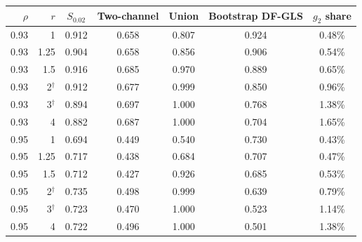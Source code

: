 \begin{tabular}{rrccccc}
\toprule
$\rho$ & $r$ & $S_{0.02}$ & Two-channel & Union & Bootstrap DF-GLS & $g_2$ share \\
\midrule
0.93 & 1 & 0.912 & 0.658 & 0.807 & 0.924 & 0.48\% \\
0.93 & 1.25 & 0.904 & 0.658 & 0.856 & 0.906 & 0.54\% \\
0.93 & 1.5 & 0.916 & 0.685 & 0.970 & 0.889 & 0.65\% \\
0.93 & 2$^\dagger$ & 0.912 & 0.677 & 0.999 & 0.850 & 0.96\% \\
0.93 & 3$^\dagger$ & 0.894 & 0.697 & 1.000 & 0.768 & 1.38\% \\
0.93 & 4 & 0.882 & 0.687 & 1.000 & 0.704 & 1.65\% \\
0.95 & 1 & 0.694 & 0.449 & 0.540 & 0.730 & 0.43\% \\
0.95 & 1.25 & 0.717 & 0.438 & 0.684 & 0.707 & 0.47\% \\
0.95 & 1.5 & 0.712 & 0.427 & 0.926 & 0.685 & 0.53\% \\
0.95 & 2$^\dagger$ & 0.735 & 0.498 & 0.999 & 0.639 & 0.79\% \\
0.95 & 3$^\dagger$ & 0.723 & 0.470 & 1.000 & 0.523 & 1.14\% \\
0.95 & 4 & 0.722 & 0.496 & 1.000 & 0.501 & 1.38\% \\
\bottomrule
\end{tabular}
